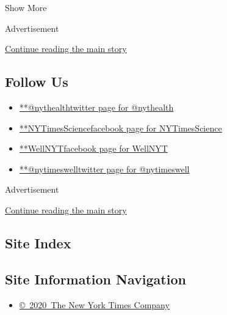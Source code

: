 Show More

Advertisement

\protect\hyperlink{after-mid3}{Continue reading the main story}

\hypertarget{follow-us}{%
\subsection{Follow Us}\label{follow-us}}

\begin{itemize}
\tightlist
\item
  \href{https://twitter.com/nythealth}{**@nythealthtwitter page for
  @nythealth}
\item
  \href{https://www.facebook.com/NYTimesScience}{**NYTimesSciencefacebook
  page for NYTimesScience}
\item
  \href{https://www.facebook.com/WellNYT}{**WellNYTfacebook page for
  WellNYT}
\item
  \href{https://twitter.com/nytimeswell}{**@nytimeswelltwitter page for
  @nytimeswell}
\end{itemize}

Advertisement

\protect\hyperlink{after-mktg}{Continue reading the main story}

\hypertarget{site-index}{%
\subsection{Site Index}\label{site-index}}

\hypertarget{site-information-navigation}{%
\subsection{Site Information
Navigation}\label{site-information-navigation}}

\begin{itemize}
\tightlist
\item
  \href{https://help.nytimes.com/hc/en-us/articles/115014792127-Copyright-notice}{©~2020~The
  New York Times Company}
\end{itemize}

